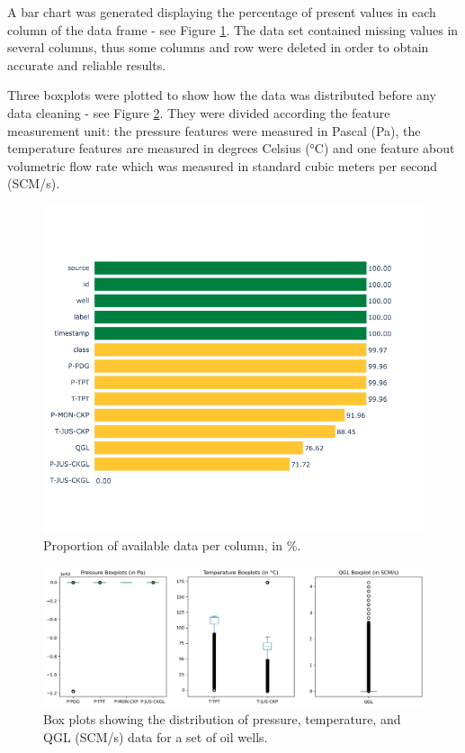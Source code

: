 \documentclass{article}
\begin{document}
A bar chart was generated displaying the percentage of present values in each column of the data frame - see Figure \ref{fig:missingvalues}. The data set contained missing values in several columns, thus some columns and row were deleted in order to obtain accurate and reliable results.

Three boxplots were plotted to show how the data was distributed before any data cleaning - see Figure \ref{fig:distr_boxplots_before_cleaning}. They were divided according the feature measurement unit: the pressure features were measured in Pascal (Pa), the temperature features are measured in degrees Celsius (°C) and one feature about volumetric flow rate which was measured in standard cubic meters per second (SCM/s).

\begin{figure}
\centering
\includegraphics[width=1\textwidth]{missingvalues.png}
\caption{\label{fig:missingvalues}Proportion of available data per column, in \%.}
\end{figure}


\begin{figure}
\centering
\includegraphics[width=1\textwidth]{distr_boxplots_before_cleaning.png}
\caption{\label{fig:distr_boxplots_before_cleaning}Box plots showing the distribution of pressure, temperature, and QGL (SCM/s) data for a set of oil wells.}
\end{figure}
\end{document}
